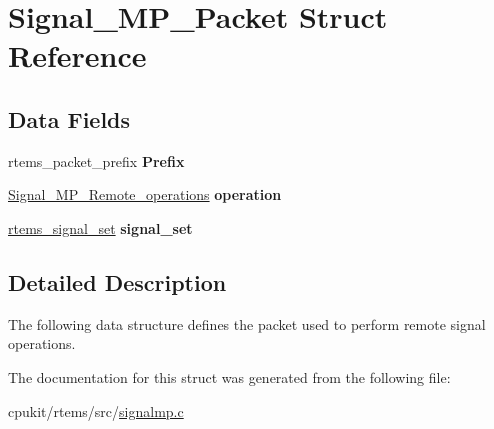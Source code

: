 \hypertarget{structSignal__MP__Packet}{}\section{Signal\+\_\+\+M\+P\+\_\+\+Packet Struct Reference}
\label{structSignal__MP__Packet}
\subsection*{Data Fields}
\begin{DoxyCompactItemize}
\item 
\mbox{\label{structSignal__MP__Packet_aa4dd185e78b71862df077c7a0603bfaf}} 
rtems\+\_\+packet\+\_\+prefix {\bfseries Prefix}
\item 
\mbox{\label{structSignal__MP__Packet_add342a6d030e3cbcd404d8f95a7ebad4}} 
\mbox{\hyperlink{signalmp_8c_a458f2730ec08ce3a1607ce24d28b45c9}{Signal\+\_\+\+M\+P\+\_\+\+Remote\+\_\+operations}} {\bfseries operation}
\item 
\mbox{\label{structSignal__MP__Packet_a40111399be65e54529d0582879d33134}} 
\mbox{\hyperlink{group__ClassicASR_gae494c868e6d04d19b2f403bb51de98eb}{rtems\+\_\+signal\+\_\+set}} {\bfseries signal\+\_\+set}
\end{DoxyCompactItemize}


\subsection{Detailed Description}
The following data structure defines the packet used to perform remote signal operations. 

The documentation for this struct was generated from the following file\+:\begin{DoxyCompactItemize}
\item 
cpukit/rtems/src/\mbox{\hyperlink{signalmp_8c}{signalmp.\+c}}\end{DoxyCompactItemize}
